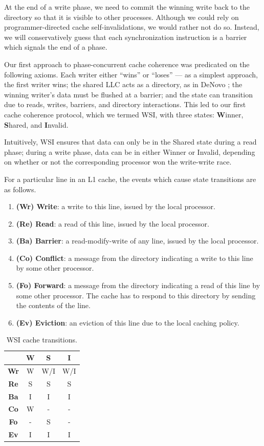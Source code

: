 \documentclass{article}
\begin{document}
At the end of a write phase, we need to commit the winning write back to the directory so that it is visible to other processes. Although we could rely on programmer-directed cache self-invalidations, we would rather not do so. Instead, we will conservatively guess that each synchronization instruction is a barrier which signals the end of a phase.

Our first approach to phase-concurrent cache coherence was predicated on the following axioms. Each writer either ``wins'' or ``loses'' --- as a simplest approach, the first writer wins; the shared LLC acts as a directory, as in DeNovo \cite{choi2010denovo}; the winning writer's data must be flushed at a barrier; and the state can transition due to reads, writes, barriers, and directory interactions. This led to our first cache coherence protocol, which we termed WSI, with three states: \textbf{W}inner, \textbf{S}hared, and \textbf{I}nvalid.

Intuitively, WSI ensures that data can only be in the Shared state during a read phase; during a write phase, data can be in either Winner or Invalid, depending on whether or not the corresponding processor won the write-write race. 

For a particular line in an L1 cache, the events which cause state transitions are as follows.

\begin{enumerate}
\item \textbf{(Wr) Write}: a write to this line, issued by the local processor.
\item \textbf{(Re) Read}: a read of this line, issued by the local processor.
\item \textbf{(Ba) Barrier}: a read-modify-write of any line, issued by the local processor.
\item \textbf{(Co) Conflict}: a message from the directory indicating a write to this line by some other processor.
\item \textbf{(Fo) Forward}: a message from the directory indicating a read of this line by some other processor. The cache has to respond to this directory by sending the contents of the line.
\item \textbf{(Ev) Eviction}: an eviction of this line due to the local caching policy.
\end{enumerate}

\begin{table}[H]
\centering
\caption{WSI cache transitions.}
\label{wsi-cache-protocol}
\begin{tabular}{|c|c|c|c|}
\hline
 & \textbf{W} & \textbf{S} & \textbf{I} \\ \hline
\textbf{Wr} & W & W/I & W/I \\ \hline
\textbf{Re} & S & S & S \\ \hline
\textbf{Ba} & I & I & I \\ \hline
\textbf{Co} & W & - & - \\ \hline
\textbf{Fo} & - & S & - \\ \hline
\textbf{Ev} & I & I & I \\ \hline
\end{tabular}
\end{table}
\end{document}
